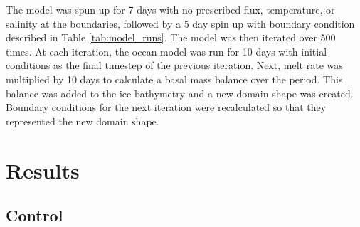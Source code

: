 The model was spun up for 7 days with no prescribed flux, temperature, or salinity at the boundaries, followed by a 5 day spin up with boundary condition described in Table \ref{tab:model_runs}. The model was then iterated over 500 times. At each iteration, the ocean model was run for 10 days with initial conditions as the final timestep of the previous iteration. Next, melt rate was multiplied by 10 days to calculate a basal mass balance over the period. This balance was added to the ice bathymetry and a new domain shape was created. Boundary conditions for the next iteration were recalculated so that they represented the new domain shape.

\newpage

\section{Results}





\subsection{Control} \label{sec:control_run}

